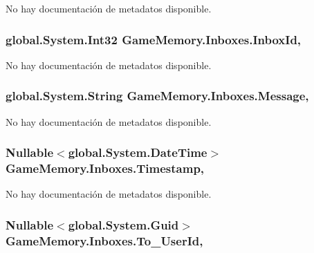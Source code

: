 No hay documentación de metadatos disponible. 

\hypertarget{class_game_memory_1_1_inboxes_ad8f869d6ea30424629d6ee2e041316fc}{
\subsubsection[{Inbox\-Id}]{\setlength{\rightskip}{0pt plus 5cm}global.\-System.\-Int32 Game\-Memory.\-Inboxes.\-Inbox\-Id\hspace{0.3cm}{\ttfamily [get]}, {\ttfamily [set]}}}\label{class_game_memory_1_1_inboxes_ad8f869d6ea30424629d6ee2e041316fc}


No hay documentación de metadatos disponible. 

\hypertarget{class_game_memory_1_1_inboxes_ab8eb8f6957620e9bf3d3b18cea3f75f2}{
\subsubsection[{Message}]{\setlength{\rightskip}{0pt plus 5cm}global.\-System.\-String Game\-Memory.\-Inboxes.\-Message\hspace{0.3cm}{\ttfamily [get]}, {\ttfamily [set]}}}\label{class_game_memory_1_1_inboxes_ab8eb8f6957620e9bf3d3b18cea3f75f2}


No hay documentación de metadatos disponible. 

\hypertarget{class_game_memory_1_1_inboxes_afded22c9818903a94a37984e929150d8}{
\subsubsection[{Timestamp}]{\setlength{\rightskip}{0pt plus 5cm}Nullable$<$global.\-System.\-Date\-Time$>$ Game\-Memory.\-Inboxes.\-Timestamp\hspace{0.3cm}{\ttfamily [get]}, {\ttfamily [set]}}}\label{class_game_memory_1_1_inboxes_afded22c9818903a94a37984e929150d8}


No hay documentación de metadatos disponible. 

\hypertarget{class_game_memory_1_1_inboxes_ae85db34db91880df980eceb08b1a4368}{
\subsubsection[{To\-\_\-\-User\-Id}]{\setlength{\rightskip}{0pt plus 5cm}Nullable$<$global.\-System.\-Guid$>$ Game\-Memory.\-Inboxes.\-To\-\_\-\-User\-Id\hspace{0.3cm}{\ttfamily [get]}, {\ttfamily [set]}}}\label{class_game_memory_1_1_inboxes_ae85db34db91880df980eceb08b1a4368}


